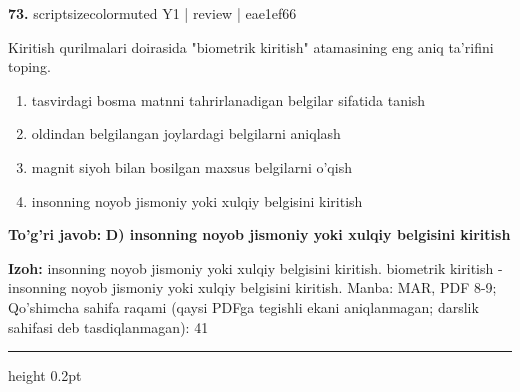 \documentclass[10pt,a4paper]{article}
\begin{document}
{\bfseries\sffamily\color{ink} 73.} {scriptsizecolor{muted} Y1 | review | eae1ef66}
\par
Kiritish qurilmalari doirasida "biometrik kiritish" atamasining eng aniq ta'rifini toping.
\begin{enumerate}[label=\Alph*),leftmargin=9mm]
\item tasvirdagi bosma matnni tahrirlanadigan belgilar sifatida tanish
\item oldindan belgilangan joylardagi belgilarni aniqlash
\item magnit siyoh bilan bosilgan maxsus belgilarni o'qish
\item insonning noyob jismoniy yoki xulqiy belgisini kiritish
\end{enumerate}
\begin{tcolorbox}[enhanced,breakable,colback=teal!4,colframe=teal!60!black,boxrule=0.45pt,arc=1.2mm,left=2.7mm,right=2.7mm,top=1.8mm,bottom=1.8mm,before skip=2mm,after skip=2mm]
{\bfseries\sffamily\color{teal}To'g'ri javob:} \textbf{D) insonning noyob jismoniy yoki xulqiy belgisini kiritish}
\par\smallskip
{\bfseries Izoh:} insonning noyob jismoniy yoki xulqiy belgisini kiritish. biometrik kiritish - insonning noyob jismoniy yoki xulqiy belgisini kiritish. Manba: MAR, PDF 8-9; Qo'shimcha sahifa raqami (qaysi PDFga tegishli ekani aniqlanmagan; darslik sahifasi deb tasdiqlanmagan): 41
\end{tcolorbox}
\vspace{2mm}\hrule height 0.2pt\vspace{3mm}
\end{document}
